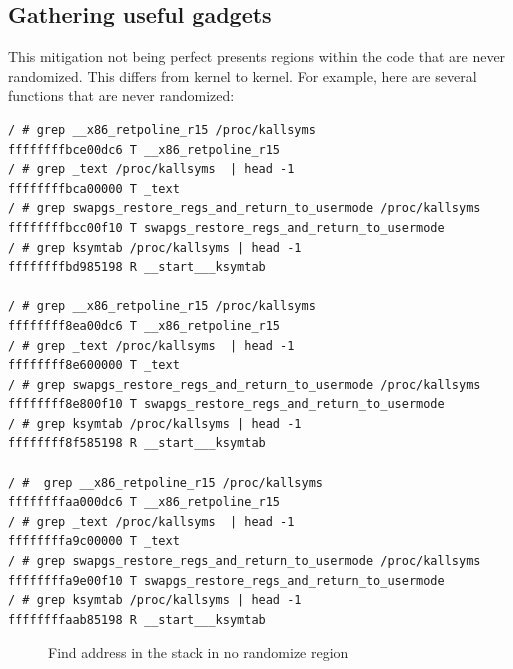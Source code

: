 \documentclass{masterthesis}
\begin{document}
\subsection{Gathering useful gadgets}
This mitigation not being perfect presents regions within the code that are never randomized.
This differs from kernel to kernel. For example, here are several functions that are never randomized:
\begin{lstlisting}
/ # grep __x86_retpoline_r15 /proc/kallsyms
ffffffffbce00dc6 T __x86_retpoline_r15
/ # grep _text /proc/kallsyms  | head -1
ffffffffbca00000 T _text
/ # grep swapgs_restore_regs_and_return_to_usermode /proc/kallsyms 
ffffffffbcc00f10 T swapgs_restore_regs_and_return_to_usermode
/ # grep ksymtab /proc/kallsyms | head -1
ffffffffbd985198 R __start___ksymtab 

/ # grep __x86_retpoline_r15 /proc/kallsyms
ffffffff8ea00dc6 T __x86_retpoline_r15
/ # grep _text /proc/kallsyms  | head -1
ffffffff8e600000 T _text
/ # grep swapgs_restore_regs_and_return_to_usermode /proc/kallsyms 
ffffffff8e800f10 T swapgs_restore_regs_and_return_to_usermode
/ # grep ksymtab /proc/kallsyms | head -1
ffffffff8f585198 R __start___ksymtab

/ #  grep __x86_retpoline_r15 /proc/kallsyms
ffffffffaa000dc6 T __x86_retpoline_r15
/ # grep _text /proc/kallsyms  | head -1
ffffffffa9c00000 T _text
/ # grep swapgs_restore_regs_and_return_to_usermode /proc/kallsyms 
ffffffffa9e00f10 T swapgs_restore_regs_and_return_to_usermode
/ # grep ksymtab /proc/kallsyms | head -1
ffffffffaab85198 R __start___ksymtab
\end{lstlisting}

\begin{figure}[h!]
   \caption{Find address in the stack in no randomize region}
   \label{graphview}
\end{figure}
\end{document}
